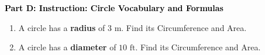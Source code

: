 \documentclass[12pt, letterpaper, fleqn]{article}
\newcommand{\blank}{\underline{\hspace{2.2cm}}}
\begin{document}
\newpage

\begin{tcolorbox}[colback=customteal!20]
\large\textcolor{black}{\textbf{Part D: Instruction: Circle Vocabulary and Formulas}}
\end{tcolorbox}

\vspace{3mm}

\begin{enumerate}[itemsep=2.2cm, leftmargin=0.6cm, resume]
\begin{itemize}
\item Circumference = \blank
\item Area = \blank
\end{itemize}
\item A circle has a \textbf{radius} of $3\text{ m}$. Find its Circumference and Area.
\item A circle has a \textbf{diameter} of $10\text{ ft}$. Find its Circumference and Area.
\end{enumerate}
\end{document}
